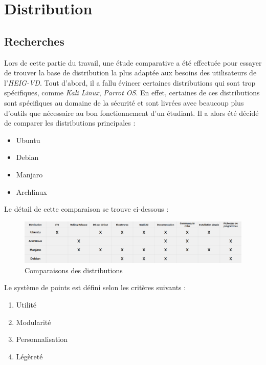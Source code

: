 \chapter{Distribution}
\label{ch:distrib}


\section{Recherches}
Lors de cette partie du travail, une étude comparative a été effectuée pour essayer de trouver la base de distribution la plus adaptée aux besoins des utilisateurs de l'\textit{HEIG-VD}.
Tout d'abord, il a fallu évincer certaines distributions qui sont trop spécifiques, comme \textit{Kali Linux}, \textit{Parrot OS}.
En effet, certaines de ces distributions sont spécifiques au domaine de la sécurité et sont livrées avec beaucoup plus d'outils que nécessaire au bon fonctionnement d'un étudiant.
Il a alors été décidé de comparer les distributions principales :
\begin{itemize}
    \item Ubuntu
    \item Debian
    \item Manjaro
    \item Archlinux
\end{itemize}   
Le détail de cette comparaison se trouve ci-dessous :

\begin{figure}[H]
	\centering
	\includegraphics[scale=0.25]{images/distros_comp.png}
	\caption{Comparaisons des distributions}
	\label{fig:distros_comp}
\end{figure}


Le système de points est défini selon les critères suivants :
\begin{enumerate}
    \item Utilité
    \item Modularité
    \item Personnalisation
    \item Légèreté
\end{enumerate}

